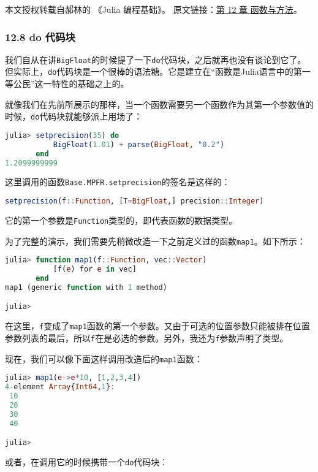 
本文授权转载自郝林的 《Julia 编程基础》。 原文链接：\href{https://github.com/hyper0x/JuliaBasics/blob/master/book/ch12.md}{第 12 章 函数与方法}。


\subsubsection{12.8 do 代码块}

我们自从在讲\verb|BigFloat|的时候提了一下\verb|do|代码块，之后就再也没有谈论到它了。但实际上，\verb|do|代码块是一个很棒的语法糖。它是建立在“函数是Julia语言中的第一等公民”这一特性的基础之上的。

就像我们在先前所展示的那样，当一个函数需要另一个函数作为其第一个参数值的时候，\verb|do|代码块就能够派上用场了：

\begin{lstlisting}[language=julia]
julia> setprecision(35) do 
           BigFloat(1.01) + parse(BigFloat, "0.2") 
       end
1.2099999999
\end{lstlisting}

这里调用的函数\verb|Base.MPFR.setprecision|的签名是这样的：

\begin{lstlisting}[language=julia]
setprecision(f::Function, [T=BigFloat,] precision::Integer)
\end{lstlisting}

它的第一个参数是\verb|Function|类型的，即代表函数的数据类型。

为了完整的演示，我们需要先稍微改造一下之前定义过的函数\verb|map1|。如下所示：

\begin{lstlisting}[language=julia]
julia> function map1(f::Function, vec::Vector)
           [f(e) for e in vec]
       end
map1 (generic function with 1 method)

julia> 
\end{lstlisting}

在这里，\verb|f|变成了\verb|map1|函数的第一个参数。又由于可选的位置参数只能被排在位置参数列表的最后，所以\verb|f|在是必选的参数。另外，我还为\verb|f|参数声明了类型。

现在，我们可以像下面这样调用改造后的\verb|map1|函数：

\begin{lstlisting}[language=julia]
julia> map1(e->e*10, [1,2,3,4])
4-element Array{Int64,1}:
 10
 20
 30
 40

julia> 
\end{lstlisting}
或者，在调用它的时候携带一个\verb|do|代码块：

